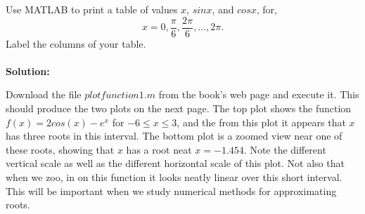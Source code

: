 \documentclass[12pt]{article}
\makeatletter
\theoremstyle{homework}
\newenvironment{exercise}[1]
{\def\@currentlabel{#1}\exercisecore}
{\endexercisecore}
\makeatother
\begin{document}
\begin{exercise}{4} Use MATLAB to print a table of values $x$, $sin x$, and $cos x$, for,
  \begin{equation*}
    x = 0, \frac{\pi}{6}, \frac{2\pi}{6}, \ldots , 2\pi.
  \end{equation*}
  Label the columns of your table.\\\\
\textbf{Solution:}




\end{exercise}
\vspace{1in}

\begin{exercise}{5}  Download the file $plotfunction1.m$ from the book's web page and execute it. This should produce the two plots on the next page. 
  The top plot shows the function $f(x) = 2cos(x) - e^{x}$ for $-6 \le x \le 3$, and the from this plot it appears that $x$ has three roots in this interval. 
  The bottom plot is a zoomed view near one of these roots, showing that $x$ has a root neat $x = -1.454$. 
  Note the different vertical scale as well as the different horizontal scale of this plot. 
  Not also that when we zoo, in on this function it looks neatly linear over this short interval. This will be important when we study numerical methods for approximating roots.\\\\


\begin{enumerate}


\end{enumerate}
\end{exercise}
\end{document}
